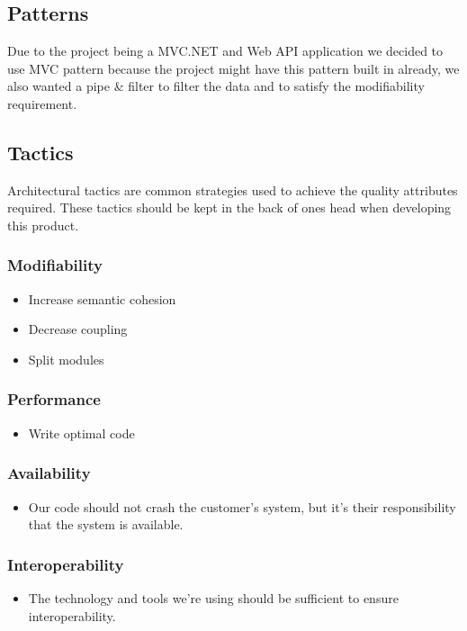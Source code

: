 \subsection{Patterns}
Due to the project being a MVC.NET and Web API application we decided to use MVC pattern because the project might have this pattern built in already, we also wanted a pipe \& filter to filter the data and to satisfy the modifiability requirement.

\subsection{Tactics}
Architectural tactics are common strategies used to achieve the quality attributes required. These tactics should be kept in the back of ones head when developing this product.
\subsubsection{Modifiability}
\begin{itemize}
\item Increase semantic cohesion
\item Decrease coupling
\item Split modules
\end{itemize}

\subsubsection{Performance}
\begin{itemize}
\item Write optimal code
\end{itemize}

\subsubsection{Availability}
\begin{itemize}
\item Our code should not crash the customer's system, but it's their responsibility that the system is available.
\end{itemize}

\subsubsection{Interoperability}
\begin{itemize}
\item The technology and tools we're using should be sufficient to ensure interoperability.
\end{itemize}

